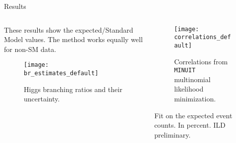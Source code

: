 \begin{block}{Results}
\begin{columns}
\begin{column}{.5\textwidth}
    These results show the expected/Standard Model values.
    The method works equally well for non-SM data.
    \begin{figure}
    \begin{minipage}{0.94\textwidth}
        \centering\texttt{[image: br\_estimates\_default]}
        \caption{Higgs branching ratios and their uncertainty.}
    \end{minipage}
    \end{figure}
\end{column}
\begin{column}{.3\textwidth}
    \begin{figure}
    \begin{minipage}{0.94\textwidth}
        \centering\texttt{[image: correlations\_default]}
        \caption{Correlations from \texttt{MINUIT} multinomial likelihood minimization.}
        \label{fig:correlations}
    \end{minipage}
    \end{figure}
    \begin{table}
        \caption{Fit on the
            expected event counts. In percent. ILD preliminary.}\label{tab:brs}
    \end{table}
\end{column}
\end{columns}
\end{block}
